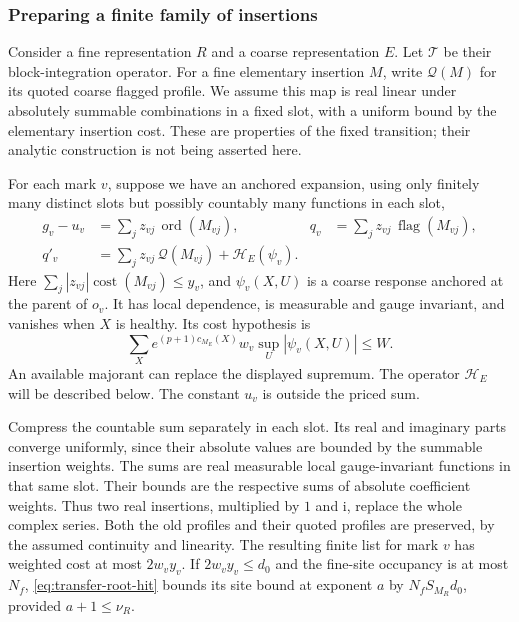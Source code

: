 \subsubsection{Preparing a finite family of insertions}
Consider a fine representation $R$ and a coarse representation $E$.
Let $\mathcal T$ be their block-integration operator. For a fine
elementary insertion $M$, write $\mathcal Q(M)$ for its quoted
coarse flagged profile. We assume this map is real linear under
absolutely summable combinations in a fixed slot, with a uniform
bound by the elementary insertion cost. These are properties of
the fixed transition; their analytic construction is not being
asserted here.

For each mark $v$, suppose we have an anchored expansion, using
only finitely many distinct slots but possibly countably many
functions in each slot,
\begin{align*}
 g_v-u_v&=\sum_j z_{vj}\,\operatorname{ord}(M_{vj}),&
 q_v&=\sum_j z_{vj}\,\operatorname{flag}(M_{vj}),\\
 q'_v&=\sum_j z_{vj}\,\mathcal Q(M_{vj})
                                      +\mathcal H_E(\psi_v).
\end{align*}
Here $\sum_j|z_{vj}|\operatorname{cost}(M_{vj})\le y_v$,
and $\psi_v(X,U)$ is a coarse response anchored at the parent of
$o_v$. It has local dependence, is measurable and gauge invariant,
and vanishes when $X$ is healthy. Its cost hypothesis is
\begin{equation}\label{eq:transfer-response-budget}
 \sum_X e^{(p+1)c_{M_E}(X)}w_v\sup_U|\psi_v(X,U)|\le W.
\end{equation}
An available majorant can replace the displayed supremum. The
operator $\mathcal H_E$ will be described below. The constant
$u_v$ is outside the priced sum.

Compress the countable sum separately in each slot. Its real and
imaginary parts converge uniformly, since their absolute values
are bounded by the summable insertion weights. The sums are real
measurable local gauge-invariant functions in that same slot.
Their bounds are the respective sums of absolute coefficient
weights. Thus two real insertions, multiplied by $1$ and $\mathrm i$,
replace the whole complex series. Both the old profiles and their
quoted profiles are preserved, by the assumed continuity and
linearity. The resulting finite list for mark $v$ has weighted
cost at most $2w_vy_v$. If $2w_vy_v\le d_0$ and the fine-site
occupancy is at most $N_f$, \eqref{eq:transfer-root-hit} bounds its
site bound at exponent $a$ by $N_fS_{M_R}d_0$, provided
$a+1\le\nu_R$.

